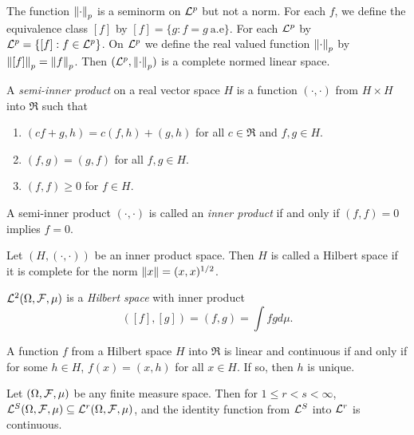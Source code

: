 \begin{remark}
The function $\left\lVert\cdot\right\rVert_p$ is a seminorm on $\mathcal L^p$ but not a norm. For each $f$, we define the equivalence class $[f]$ by $[f]=\{g:f=g\ \text{a.e} \}$. For each $\mathcal L^p$ by $\mathcal L^p=\{[f]: f\in\mathcal L^p \}$. On $\mathcal L^p$ we define the real valued function $\left\lVert\cdot\right\rVert_p$ by $\left\lVert[f]\right\rVert_p=\left\lVert f\right\rVert_p$. Then $(\mathcal L^p,\left\lVert\cdot\right\rVert_p)$ is a complete normed linear space.
\end{remark}



\begin{definition}
A \emph{semi-inner product} on a real vector space $H$ is a function $(\cdot,\cdot)$ from $H\times H$ into $\Re$ such that
\begin{enumerate}
\item $(cf+g,h)=c(f,h)+(g,h)$ for all $c\in \Re$ and $f,g\in H$.
\item $(f,g)=(g,f)$ for all $f,g\in H$.
\item $(f,f)\geq 0$ for $f\in H$.
\end{enumerate}
A semi-inner product $(\cdot,\cdot)$ is called an \emph{inner product} if and only if $(f,f)=0$ implies $f=0$.
\end{definition}




\begin{definition}
Let $(H,(\cdot, \cdot))$ be an inner product space. Then $H$ is called a Hilbert space if it is complete for the norm $\left\lVert x\right\rVert=(x,x)^{1/2}$.
\end{definition}




\begin{theorem}
$\mathcal L^2(\Omega, \mathcal F, \mu)$ is a \emph{Hilbert space} with inner product
\begin{equation*}
([f],[g])=(f,g)=\int fgd\mu.
\end{equation*}
\end{theorem}




\begin{theorem}
A function $f$ from a Hilbert space $H$ into $\Re$ is linear and continuous if and only if for some $h\in H$, $f(x)=(x,h)$ for all $x\in H$. If so, then $h$ is unique.
\end{theorem}



\begin{theorem}
Let $(\Omega, \mathcal F, \mu)$ be any finite measure space. Then for $1\leq r<s<\infty$, $\mathcal L^S(\Omega, \mathcal F, \mu)\subseteq \mathcal L^r(\Omega, \mathcal F, \mu)$, and the identity function from $\mathcal L^S$ into $\mathcal L^r$ is continuous.
\end{theorem}



